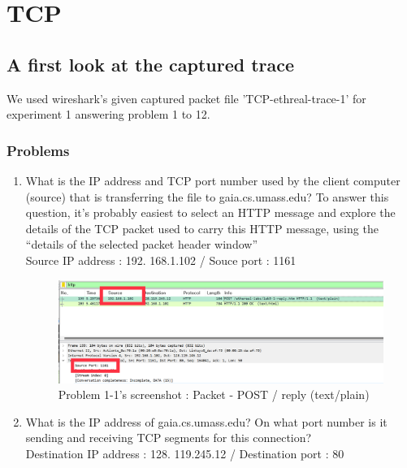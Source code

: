 \section{TCP}
\subsection{A first look at the captured trace}
    We used wireshark's given captured packet file 'TCP-ethreal-trace-1' for experiment 1 answering problem 1 to 12.
    \subsubsection*{Problems}
    \begin{enumerate}[label=\bfseries Problem \arabic*:,leftmargin=*,labelindent=1em]
        \item What is the IP address and TCP port number used by the client computer (source) that is transferring the file to gaia.cs.umass.edu?
        To answer this question, it’s probably easiest to select an HTTP message and explore the details of the TCP packet used to carry this HTTP message, using the “details of the selected packet header window”\\[0.2mm]
        \soln Source IP address : 192. 168.1.102  /  Souce port : 1161
        \begin{figure}[!h]\centering
        \hspace{15mm}
    		\includegraphics[width=.85\textwidth]{image/week02/1-1-1.png}
    		\caption{\footnotesize Problem 1-1's screenshot : Packet - POST / reply (text/plain)}
    		\vspace{-10pt}
        \end{figure}
        \item What is the IP address of gaia.cs.umass.edu? On what port number is it sending and receiving TCP segments for this connection?\\[0.2mm]
        \soln Destination IP address : 128. 119.245.12  /  Destination port : 80

\end{enumerate}
